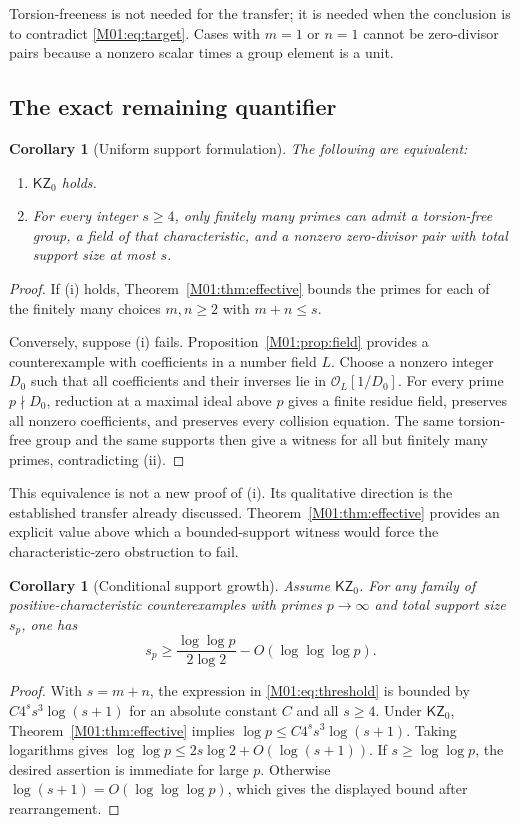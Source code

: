 \documentclass[11pt,a4paper,oneside]{report}
\newtheorem{corollary}[theorem]{Corollary}
\theoremstyle{definition}
\theoremstyle{remark}
\newcommand{\KZ}{\mathsf{KZ}_0}
\begin{document}
Torsion-freeness is not needed for the transfer; it is needed when the
conclusion is to contradict \eqref{M01:eq:target}. Cases with $m=1$ or $n=1$
cannot be zero-divisor pairs because a nonzero scalar times a group
element is a unit.

\subsection{The exact remaining quantifier}

\begin{corollary}[Uniform support formulation]\label{M01:cor:uniform}
The following are equivalent:
\begin{enumerate}[label=(\roman*)]
\item $\KZ$ holds.
\item For every integer $s\ge4$, only finitely many primes can admit a
torsion-free group, a field of that characteristic, and a nonzero
zero-divisor pair with total support size at most $s$.
\end{enumerate}
\end{corollary}
\begin{proof}
If (i) holds, Theorem~\ref{M01:thm:effective} bounds the primes for each
of the finitely many choices $m,n\ge2$ with $m+n\le s$.

Conversely, suppose (i) fails. Proposition~\ref{M01:prop:field} provides a
counterexample with coefficients in a number field $L$. Choose a
nonzero integer $D_0$ such that all coefficients and their inverses lie
in $\mathcal O_L[1/D_0]$. For every prime $p\nmid D_0$, reduction at
a maximal ideal above $p$ gives a finite residue field, preserves all
nonzero coefficients, and preserves every collision equation. The
same torsion-free group and the same supports then give a witness for
all but finitely many primes, contradicting (ii).
\end{proof}

This equivalence is not a new proof of (i). Its qualitative direction is
the established transfer already discussed. Theorem~\ref{M01:thm:effective}
provides an explicit value above which a bounded-support witness would
force the characteristic-zero obstruction to fail.

\begin{corollary}[Conditional support growth]\label{M01:cor:growth}
Assume $\KZ$. For any family of positive-characteristic counterexamples
with primes $p\to\infty$ and total support size $s_p$, one has
\[
s_p\ge\frac{\log\log p}{2\log2}
       -O(\log\log\log p).
\]
\end{corollary}
\begin{proof}
With $s=m+n$, the expression in \eqref{M01:eq:threshold} is bounded by
$C4^s s^3\log(s+1)$ for an absolute constant $C$ and all $s\ge4$.
Under $\KZ$, Theorem~\ref{M01:thm:effective} implies
$\log p\le C4^s s^3\log(s+1)$. Taking logarithms gives
$\log\log p\le2s\log2+O(\log(s+1))$.
If $s\ge\log\log p$, the desired assertion is immediate for large $p$.
Otherwise $\log(s+1)=O(\log\log\log p)$, which gives the displayed
bound after rearrangement.
\end{proof}
\end{document}
